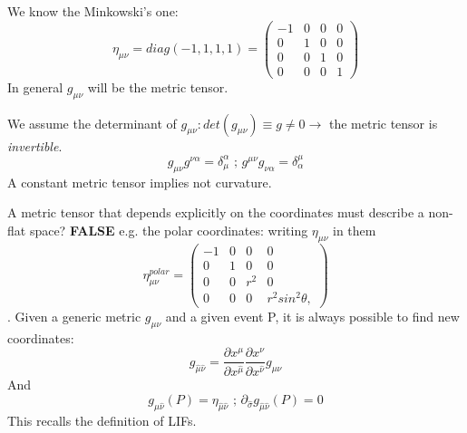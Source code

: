 We know the Minkowski's one:
\begin{equation}
\eta_{\mu \nu } = diag\left( -1,1,1,1 \right) = \begin{pmatrix}
-1 & 0 & 0 & 0 \\
0 & 1 & 0 & 0 \\
0 & 0 & 1 & 0 \\
0 & 0 & 0 & 1
\end{pmatrix} 
\end{equation}
\bigskip
In general $g_{\mu \nu }$ will be the metric tensor.\par
We assume the determinant of $g_{\mu \nu }: det\left( g_{\mu \nu } \right) \equiv g \neq 0 \to $ the metric tensor is \emph{invertible}.
\[
g_{\mu \nu }g^{\nu \alpha } = \delta^{\alpha }_{\mu } \text{ ; } g^{\mu \nu }g_{\nu \alpha } = \delta^{\mu }_{\alpha }
\]
A constant metric tensor implies not curvature.\par
A metric tensor that depends explicitly on the coordinates must describe a non-flat space? \textbf{FALSE} e.g. the polar coordinates: writing $\eta_{\mu \nu }$ in them
\begin{equation}
\eta_{\mu \nu }^{polar} = \begin{pmatrix}
-1 & 0 & 0 & 0 \\
0 & 1 & 0 & 0 \\
0 & 0 & r^{2} & 0 \\
0 & 0 & 0 & r^{2}sin^{2}\theta ,
\end{pmatrix} 
\end{equation}.
Given a generic metric $g_{\mu \nu }$ and a given event P, it is always possible to find new coordinates:
\[
g_{\hat{\mu }\hat{\nu }} = \frac{\partial x^{\mu }}{\partial x^{\hat{\mu }}} \frac{\partial x^{\nu }}{\partial x^{\hat{\nu }}} g_{\mu \nu }
\]
And
\[
g_{\hat{\mu }\hat{\nu }}\left( P \right) = \eta_{\hat{\mu }\hat{\nu }} \text{ ; } \partial_{\hat{\sigma }}g_{\hat{\mu }\hat{\nu }}\left( P \right)=0
\]
This recalls the definition of LIFs.


